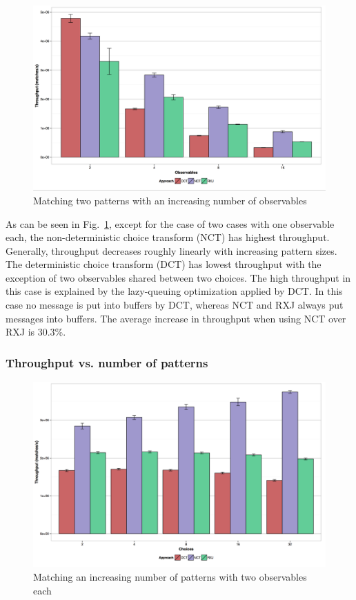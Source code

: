 \documentclass[runningheads]{llncs}
\begin{document}
\begin{sloppypar}
\begin{figure}[h]
  \centering
  \includegraphics[scale=0.30]{img/two-patterns-N-observables.pdf}
  \caption{Matching two patterns with an increasing number of observables}
  \label{fig:TwoChoiceNObservables}
\end{figure}

As can be seen in Fig.~\ref{fig:TwoChoiceNObservables}, except for the case
of two cases with one observable each, the non-deterministic choice transform
(NCT) has highest throughput. Generally, throughput decreases roughly linearly
with increasing pattern sizes. The deterministic choice transform (DCT) has
lowest throughput with the exception of two observables shared between two
choices. The high throughput in this case is explained by the lazy-queuing
optimization applied by DCT. In this case no message is put into buffers by
DCT, whereas NCT and RXJ always put messages into buffers. The average
increase in throughput when using NCT over RXJ is 30.3\%.

\subsubsection{Throughput vs. number of patterns}

\begin{figure}[h]
  \centering
  \includegraphics[scale=0.30]{img/N-patterns-two-observables.pdf}
  \caption{Matching an increasing number of patterns with two observables each}
  \label{fig:NChoiceTwoObservables}
\end{figure}


\end{sloppypar}
\end{document}
